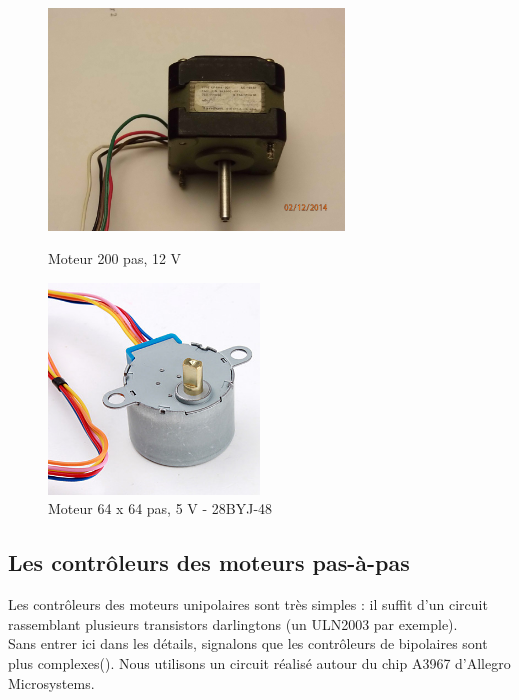 \documentclass[a4paper,10pt]{report}
\begin{document}
\begin{figure}[h!]
\begin{minipage}{.5\textwidth}
	\centering
	\includegraphics[width=0.7\textwidth]{Tandon.JPG}
	\caption{Moteur 200 pas, 12 V}
    \label{Tandon}
\end{minipage}%
\begin{minipage}{.5\textwidth}
	\centering
	\includegraphics[width=0.5\textwidth]{stepper5V.jpg}
	\caption{Moteur 64 x 64 pas, 5 V - 28BYJ-48}
    \label{28BYJ-48}
\end{minipage}
\end{figure}
\subsection{Les contrôleurs des moteurs pas-à-pas}
Les contrôleurs des moteurs unipolaires sont très simples : il suffit d'un circuit rassemblant plusieurs transistors darlingtons (un ULN2003 par exemple).\\
Sans entrer ici dans les détails, signalons que les contrôleurs de bipolaires sont plus complexes(\cite{stepctrl}). Nous utilisons un circuit réalisé autour du chip A3967 d'Allegro Microsystems.
\end{document}
